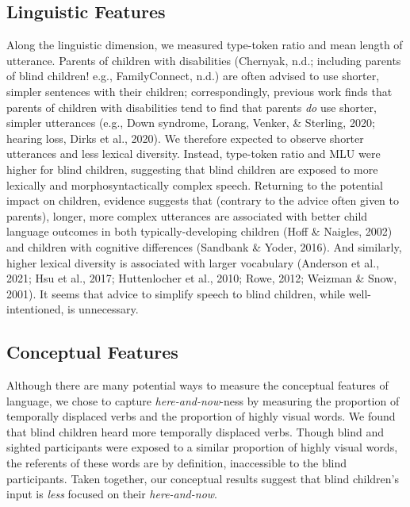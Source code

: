 \documentclass[
  man]{apa6}
\begin{document}
\hypertarget{linguistic-features-2}{%
\subsection{Linguistic Features}\label{linguistic-features-2}}

Along the linguistic dimension, we measured type-token ratio and mean length of utterance. Parents of children with disabilities (Chernyak, n.d.; including parents of blind children! e.g., FamilyConnect, n.d.) are often advised to use shorter, simpler sentences with their children; correspondingly, previous work finds that parents of children with disabilities tend to find that parents \emph{do} use shorter, simpler utterances (e.g., Down syndrome, Lorang, Venker, \& Sterling, 2020; hearing loss, Dirks et al., 2020). We therefore expected to observe shorter utterances and less lexical diversity. Instead, type-token ratio and MLU were higher for blind children, suggesting that blind children are exposed to more lexically and morphosyntactically complex speech. Returning to the potential impact on children, evidence suggests that (contrary to the advice often given to parents), longer, more complex utterances are associated with better child language outcomes in both typically-developing children (Hoff \& Naigles, 2002) and children with cognitive differences (Sandbank \& Yoder, 2016). And similarly, higher lexical diversity is associated with larger vocabulary (Anderson et al., 2021; Hsu et al., 2017; Huttenlocher et al., 2010; Rowe, 2012; Weizman \& Snow, 2001). It seems that advice to simplify speech to blind children, while well-intentioned, is unnecessary.

\hypertarget{conceptual-features-2}{%
\subsection{Conceptual Features}\label{conceptual-features-2}}

Although there are many potential ways to measure the conceptual features of language, we chose to capture \emph{here-and-now}-ness by measuring the proportion of temporally displaced verbs and the proportion of highly visual words. We found that blind children heard more temporally displaced verbs. Though blind and sighted participants were exposed to a similar proportion of highly visual words, the referents of these words are by definition, inaccessible to the blind participants. Taken together, our conceptual results suggest that blind children's input is \emph{less} focused on their \emph{here-and-now}.
\end{document}

